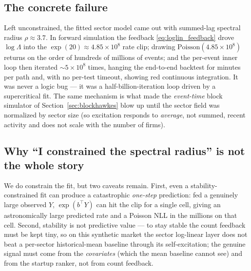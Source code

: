 \documentclass[11pt]{article}
\theoremstyle{plain}
\theoremstyle{definition}
\theoremstyle{remark}
\begin{document}
\subsection{The concrete failure}
Left unconstrained, the fitted sector model came out with summed-lag spectral radius $\rho\approx3.7$. In forward simulation the feedback \eqref{eq:loglin_feedback} drove $\log\Lambda$ into the $\exp(20)\approx4.85\times10^8$ rate clip; drawing $\mathrm{Poisson}(4.85\times10^8)$ returns on the order of hundreds of millions of events; and the per-event inner loop then iterated $\sim\!5\times10^8$ times, hanging the end-to-end backtest for minutes per path and, with no per-test timeout, showing red continuous integration. It was never a logic bug --- it was a half-billion-iteration loop driven by a supercritical fit. The same mechanism is what made the \emph{event-time} block simulator of Section~\ref{sec:blockhawkes} blow up until the sector field was normalized by sector size (so excitation responds to \emph{average}, not summed, recent activity and does not scale with the number of firms).

\subsection{Why ``I constrained the spectral radius'' is not the whole story}
We do constrain the fit, but two caveats remain. First, even a stability-constrained fit can produce a catastrophic \emph{one-step} prediction: fed a genuinely large observed $Y$, $\exp(b^\top Y)$ can hit the clip for a single cell, giving an astronomically large predicted rate and a Poisson NLL in the millions on that cell. Second, stability is not predictive value --- to stay stable the count feedback must be kept tiny, so on this synthetic market the sector log-linear layer does not beat a per-sector historical-mean baseline through its self-excitation; the genuine signal must come from the \emph{covariates} (which the mean baseline cannot see) and from the startup ranker, not from count feedback.
\end{document}
